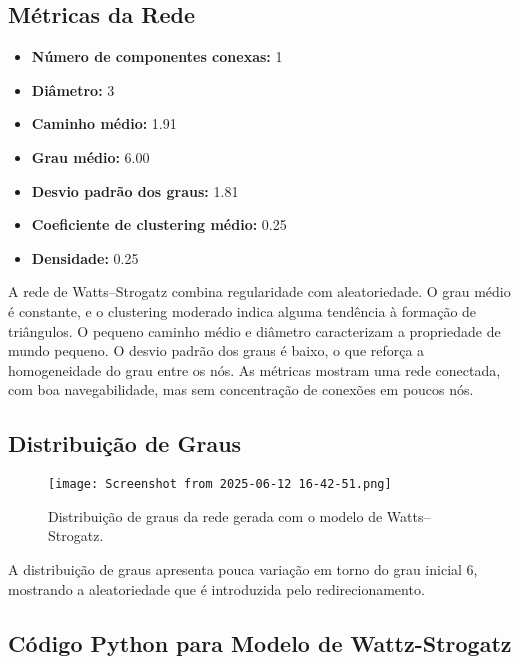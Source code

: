 \documentclass{article}
\begin{document}
\subsection*{Métricas da Rede}

\begin{itemize}
    \item \textbf{Número de componentes conexas:} 1
    \item \textbf{Diâmetro:} 3
    \item \textbf{Caminho médio:} 1.91
    \item \textbf{Grau médio:} 6.00
    \item \textbf{Desvio padrão dos graus:} 1.81
    \item \textbf{Coeficiente de clustering médio:} 0.25
    \item \textbf{Densidade:} 0.25
\end{itemize}

A rede de Watts–Strogatz combina regularidade com aleatoriedade. O grau médio é constante, e o clustering moderado indica alguma tendência à formação de triângulos. O pequeno caminho médio e diâmetro caracterizam a propriedade de mundo pequeno. O desvio padrão dos graus é baixo, o que reforça a homogeneidade do grau entre os nós. As métricas mostram uma rede conectada, com boa navegabilidade, mas sem concentração de conexões em poucos nós.

\subsection*{Distribuição de Graus}

\begin{figure}[h]
\centering
\texttt{[image: Screenshot from 2025-06-12 16-42-51.png]}
\caption{Distribuição de graus da rede gerada com o modelo de Watts–Strogatz.}
\end{figure}

A distribuição de graus apresenta pouca variação em torno do grau inicial 6, mostrando a aleatoriedade que é introduzida pelo redirecionamento.

\subsection{Código Python para Modelo de Wattz-Strogatz}
\end{document}
